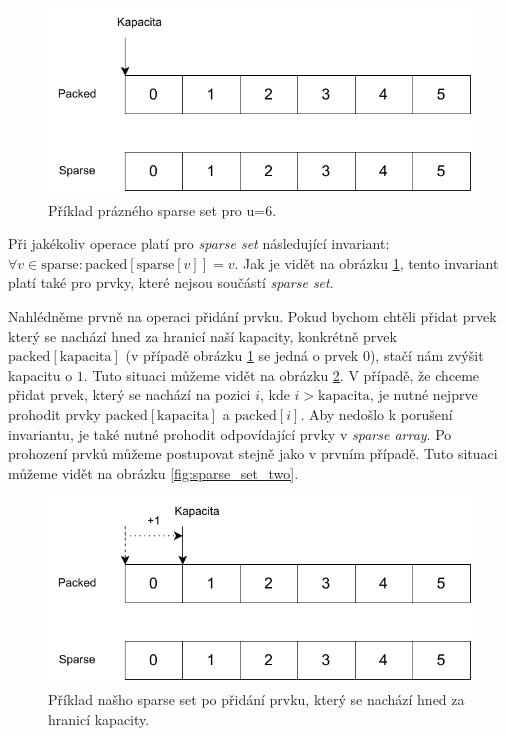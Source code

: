 \begin{figure}
    \centering
    \includegraphics[width=0.6\linewidth]{img/sparse_set_empty.pdf}
    \caption{Příklad prázného sparse set pro u=6.}
    \label{fig:sparse_set_empty}
\end{figure}

Při jakékoliv operace platí pro \textit{sparse set} následující invariant: $\forall v \in \text{sparse}: \text{packed}\left[\text{sparse}\left[v\right]\right] = v$. Jak je vidět na obrázku \ref{fig:sparse_set_empty}, tento invariant platí také pro prvky, které nejsou součástí \textit{sparse set}.

Nahlédněme prvně na operaci přidání prvku. Pokud bychom chtěli přidat prvek který se nachází hned za hranicí naší kapacity, konkrétně prvek $\text{packed}\left[\text{kapacita}\right]$ (v případě obrázku \ref{fig:sparse_set_empty} se jedná o prvek $0$), stačí nám zvýšit kapacitu o $1$. Tuto situaci můžeme vidět na obrázku \ref{fig:sparse_set_one}. V případě, že chceme přidat prvek, který se nachází na pozici $i$, kde $i > \text{kapacita}$, je nutné nejprve prohodit prvky $\text{packed}\left[\text{kapacita}\right]$ a $\text{packed}\left[i\right]$. Aby nedošlo k porušení invariantu, je také nutné prohodit odpovídající prvky v \textit{sparse array}. Po prohození prvků můžeme postupovat stejně jako v prvním případě. Tuto situaci můžeme vidět na obrázku \ref{fig:sparse_set_two}.

\begin{figure}
    \centering
    \includegraphics[width=0.6\linewidth]{img/sparse_set_one.pdf}
    \caption{Příklad našho sparse set po přidání prvku, který se nachází hned za hranicí kapacity.}
    \label{fig:sparse_set_one}
\end{figure}

